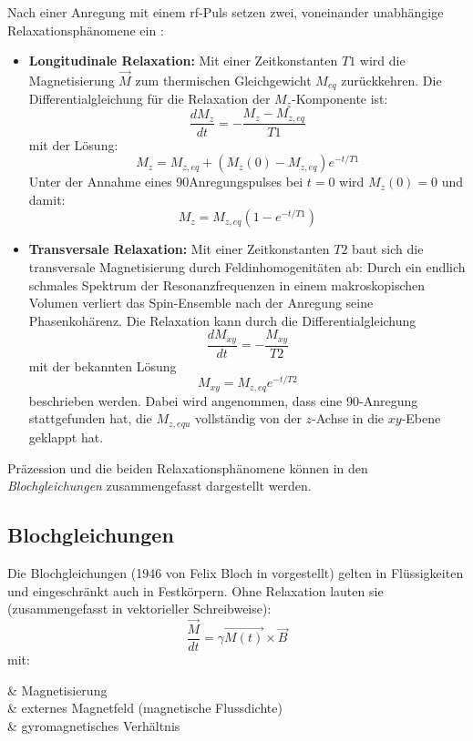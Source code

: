 Nach einer Anregung mit einem \gls{rf}-Puls setzen zwei, voneinander unabhängige Relaxationsphänomene ein \cite{Nishimura1996}:
\begin{itemize}
	\item \textbf{Longitudinale Relaxation:} Mit einer Zeitkonstanten $T1$ wird die Magnetisierung $\vec{M}$ zum thermischen Gleichgewicht $M_{eq}$ zurückkehren. Die Differentialgleichung für die Relaxation der $M_z$-Komponente ist:
	\begin{equation}
		\frac{dM_z}{dt}=-\frac{M_z-M_{z,eq}}{T1}
	\end{equation}
	mit der Lösung:
	\begin{equation}
		M_z=M_{z,eq}+\left(M_z(0)-M_{z,eq}\right) e^{-t/T1}
	\end{equation}
	Unter der Annahme eines 90\degree Anregungspulses bei $t=0$ wird $M_z(0)=0$ und damit:
	\begin{equation}
		M_z=M_{z,eq}\left(1-e^{-t/T1}\right)
	\end{equation}
	\item \textbf{Transversale Relaxation:} Mit einer Zeitkonstanten $T2$ baut sich die transversale Magnetisierung durch Feldinhomogenitäten ab: Durch ein endlich schmales Spektrum der Resonanzfrequenzen in einem makroskopischen Volumen verliert das Spin-Ensemble nach der Anregung seine Phasenkohärenz. Die Relaxation kann durch die Differentialgleichung
	\begin{equation}
		\frac{dM_{xy}}{dt}=-\frac{M_{xy}}{T2}
	\end{equation}
	mit der bekannten Lösung
	\begin{equation}
		M_{xy}=M_{z,eq} e^{-t/T2}
	\end{equation}
	beschrieben werden. Dabei wird angenommen, dass eine 90\degree-Anregung stattgefunden hat, die $M_{z,equ}$ vollständig von der $z$-Achse in die $xy$-Ebene geklappt hat.
\end{itemize}

Präzession und die beiden Relaxationsphänomene können in den \textit{Blochgleichungen} zusammengefasst dargestellt werden.

\subsection{Blochgleichungen}
\label{sec:blocheq}
Die Blochgleichungen (1946 von Felix Bloch in \cite{Bloch1946} vorgestellt) gelten in Flüssigkeiten und eingeschränkt auch in Festkörpern. 
Ohne Relaxation lauten sie (zusammengefasst in vektorieller Schreibweise):
\begin{equation}
\label{eq:bloch1}
	\frac{\vec{M}}{dt} = \gamma \vec{M(t)} \times \vec{B}
\end{equation}
mit:
\begin{with*}
	 & Magnetisierung \\
	 & externes Magnetfeld (magnetische Flussdichte) \\
	\gamma & gyromagnetisches Verhältnis \\
\end{with*}

